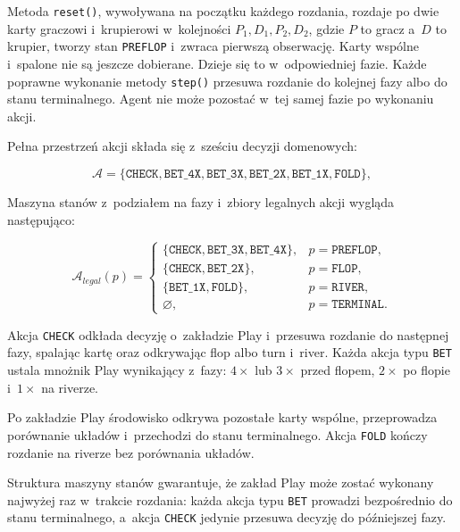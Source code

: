 Metoda \texttt{reset()}, wywoływana na początku każdego rozdania, rozdaje po dwie karty
graczowi i~krupierowi w~kolejności \(P_1, D_1, P_2, D_2\), gdzie \(P\) to gracz a~\(D\) to krupier, tworzy stan
\texttt{PREFLOP} i~zwraca pierwszą obserwację. Karty wspólne i~spalone nie są
jeszcze dobierane. Dzieje się to w~odpowiedniej fazie. Każde poprawne wykonanie metody \texttt{step()} przesuwa
rozdanie do kolejnej fazy albo do stanu terminalnego. Agent nie może pozostać
w~tej samej fazie po wykonaniu akcji.

Pełna przestrzeń akcji składa się z~sześciu decyzji domenowych:

\begin{equation}
    \mathcal{A} =
    \{
        \texttt{CHECK},
        \texttt{BET\_4X},
        \texttt{BET\_3X},
        \texttt{BET\_2X},
        \texttt{BET\_1X},
        \texttt{FOLD}
    \},
\end{equation}

Maszyna stanów z~podziałem na fazy i~zbiory legalnych akcji wygląda następująco:

\begin{equation}
    \mathcal{A}_{legal}(p) =
    \begin{cases}
        \{\texttt{CHECK}, \texttt{BET\_3X}, \texttt{BET\_4X}\},
        & p = \texttt{PREFLOP}, \\[1mm]
        \{\texttt{CHECK}, \texttt{BET\_2X}\},
        & p = \texttt{FLOP}, \\[1mm]
        \{\texttt{BET\_1X}, \texttt{FOLD}\},
        & p = \texttt{RIVER}, \\[1mm]
        \varnothing,
        & p = \texttt{TERMINAL}.
    \end{cases}
\end{equation}

Akcja \texttt{CHECK} odkłada decyzję o~zakładzie Play i~przesuwa rozdanie do
następnej fazy, spalając kartę oraz odkrywając flop albo turn i~river. Każda
akcja typu \texttt{BET} ustala mnożnik Play wynikający z~fazy: \(4\times\)
lub \(3\times\) przed flopem, \(2\times\) po flopie i~\(1\times\) na riverze.

Po zakładzie Play środowisko odkrywa pozostałe karty wspólne, przeprowadza
porównanie układów i~przechodzi do stanu terminalnego. Akcja \texttt{FOLD} kończy
rozdanie na riverze bez porównania układów.

Struktura maszyny stanów gwarantuje, że zakład Play może zostać wykonany najwyżej
raz w~trakcie rozdania: każda akcja typu \texttt{BET} prowadzi bezpośrednio do stanu
terminalnego, a~akcja \texttt{CHECK} jedynie przesuwa decyzję do późniejszej fazy.

